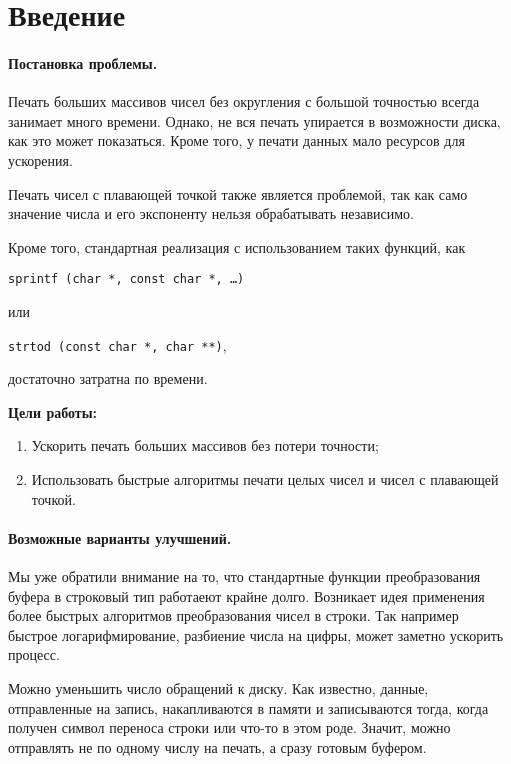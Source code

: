 \section*{Введение}
\paragraph{Постановка проблемы.}
Печать больших массивов чисел без округления с большой точностью всегда занимает много времени.
Однако, не вся печать упирается в возможности диска, как это может показаться.
Кроме того, у печати данных мало ресурсов для ускорения.

Печать чисел с плавающей точкой также является проблемой, так как само значение числа и его экспоненту нельзя обрабатывать независимо. 

Кроме того, стандартная реализация с использованием таких функций, как 
\begin{center}
\texttt{sprintf (char *, const char *, \dots)}
\end{center}
или \begin{center}
\texttt{strtod (const char *, char **)},
\end{center} достаточно затратна по времени.

\vspace{5pt}
\textbf{Цели работы:}
\begin{enumerate}
\item Ускорить печать больших массивов без потери точности;
\item Использовать быстрые алгоритмы печати целых чисел и чисел с плавающей точкой.
\end{enumerate}

\paragraph{Возможные варианты улучшений.}
Мы уже обратили внимание на то, что стандартные функции преобразования буфера в строковый тип  работаеют крайне долго. 
Возникает идея применения более быстрых алгоритмов преобразования чисел в строки. 
Так например быстрое логарифмирование, разбиение числа на цифры, может заметно ускорить процесс.

Можно уменьшить число обращений к диску.
Как известно, данные, отправленные на запись, накапливаются в памяти и записываются тогда, когда получен символ переноса строки или что-то в этом роде.
Значит, можно отправлять не по одному числу на печать, а сразу готовым буфером.

